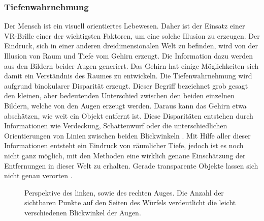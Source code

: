 \subsubsection{Tiefenwahrnehmung}


Der Mensch ist ein visuell orientiertes Lebewesen. Daher ist der Einsatz einer VR-Brille einer der wichtigsten
Faktoren, um eine solche Illusion zu erzeugen. Der Eindruck, sich in einer anderen dreidimensionalen Welt zu befinden, 
wird von der Illusion von Raum und Tiefe vom Gehirn erzeugt.
Die Information dazu werden aus den Bildern beider Augen generiert.
Das Gehirn hat einige Möglichkeiten sich damit ein Verständnis des Raumes zu entwickeln.
Die Tiefenwahrnehmung wird aufgrund binokularer Disparität erzeugt. Dieser Begriff bezeichnet grob gesagt den kleinen, aber bedeutenden
Unterschied zwischen den beiden einzelnen Bildern, welche von den Augen erzeugt werden. Daraus kann das Gehirn etwa
abschätzen, wie weit ein Objekt entfernt ist.
Diese Disparitäten entstehen durch Informationen wie Verdeckung, Schattenwurf oder die unterschiedlichen Orientierungen von Linien zwischen
beiden Blickwinkeln \parencite{Tauer2010}. Mit Hilfe aller dieser Informationen entsteht ein Eindruck von räumlicher Tiefe, 
jedoch ist es noch nicht ganz möglich, mit den Methoden eine wirklich genaue Einschätzung der Entfernungen in dieser Welt zu erhalten. 
Gerade transparente Objekte lassen sich nicht genau verorten \parencite{ElJamiy2019}.



\begin{figure}[!h]
	\centering
	\begin{footnotesize}
		\caption{Perspektive des linken, sowie des rechten Auges. Die Anzahl der sichtbaren Punkte auf den Seiten des Würfels verdeutlicht die leicht verschiedenen Blickwinkel der Augen.}
	\end{footnotesize}
\end{figure}


